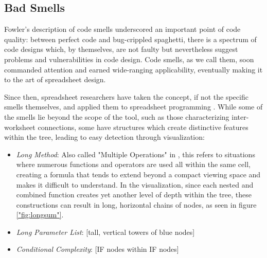 \documentclass[conference]{IEEEtran}
\begin{document}
	\subsection{Bad Smells} Fowler's description of code smells
	\cite{fowler2009refactoring} underscored an important point of code quality:
	between perfect code and bug-crippled spaghetti,  there is a spectrum of code
	designs which, by themselves, are not faulty but nevertheless suggest problems
	and vulnerabilities in code design. Code smells, as we call them, soon
	commanded attention and earned wide-ranging applicability, eventually making it
	to the art of spreadsheet design.
	
	Since then, spreadsheet researchers have taken the concept, if not the specific
	smells themselves, and applied them to spreadsheet programming
	\cite{hermans2012detecting} \cite{cunha2012towards} \cite{jansen2015code}
	\cite{asavametha2012detecting} . While some of the smells lie beyond the scope
	of the tool, such as those characterizing inter-worksheet connections, some
	have structures which create distinctive features within the tree, leading to
	easy detection through visualization: \par
	
	\begin{itemize} \item \textit{Long Method}: Also called "Multiple Operations"
		in \cite{hermans2012detecting}, this refers to situations where numerous
		functions and operators are used all within the same cell, creating a formula
		that tends to extend beyond a compact viewing space and makes it difficult to
		understand. In the visualization, since each nested and combined function
		creates yet another level of depth within the tree, these constructions can
		result in long, horizontal chains of nodes, as seen in figure
		\ref{"fig:longsum"}. \item \textit{Long Parameter List}: [tall, vertical towers
		of blue nodes] \item \textit{Conditional Complexity}: [IF nodes within IF
		nodes] \end{itemize}
	
\end{document}
